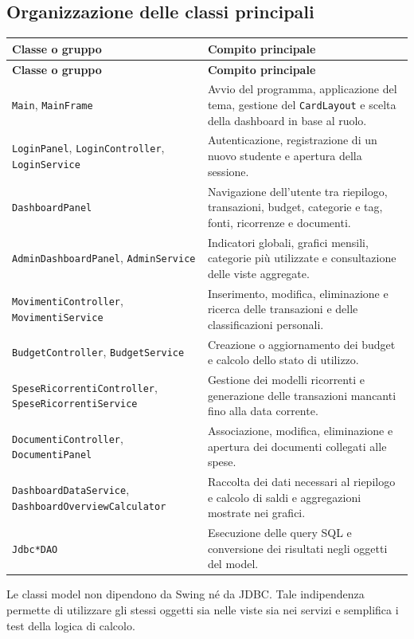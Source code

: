 \documentclass[11pt,a4paper]{article}
\begin{document}
\subsection{Organizzazione delle classi principali}
\begin{longtable}{p{5.1cm} p{9.5cm}}
\toprule
\textbf{Classe o gruppo} & \textbf{Compito principale} \\
\midrule
\endfirsthead
\toprule
\textbf{Classe o gruppo} & \textbf{Compito principale} \\
\midrule
\endhead
\texttt{Main}, \texttt{MainFrame} & Avvio del programma, applicazione del tema, gestione del \texttt{CardLayout} e scelta della dashboard in base al ruolo. \\
\texttt{LoginPanel}, \texttt{LoginController}, \texttt{LoginService} & Autenticazione, registrazione di un nuovo studente e apertura della sessione. \\
\texttt{DashboardPanel} & Navigazione dell'utente tra riepilogo, transazioni, budget, categorie e tag, fonti, ricorrenze e documenti. \\
\texttt{AdminDashboardPanel}, \texttt{AdminService} & Indicatori globali, grafici mensili, categorie più utilizzate e consultazione delle viste aggregate. \\
\texttt{MovimentiController}, \texttt{MovimentiService} & Inserimento, modifica, eliminazione e ricerca delle transazioni e delle classificazioni personali. \\
\texttt{BudgetController}, \texttt{BudgetService} & Creazione o aggiornamento dei budget e calcolo dello stato di utilizzo. \\
\texttt{SpeseRicorrentiController}, \texttt{SpeseRicorrentiService} & Gestione dei modelli ricorrenti e generazione delle transazioni mancanti fino alla data corrente. \\
\texttt{DocumentiController}, \texttt{DocumentiPanel} & Associazione, modifica, eliminazione e apertura dei documenti collegati alle spese. \\
\texttt{DashboardDataService}, \texttt{DashboardOverviewCalculator} & Raccolta dei dati necessari al riepilogo e calcolo di saldi e aggregazioni mostrate nei grafici. \\
\texttt{Jdbc*DAO} & Esecuzione delle query SQL e conversione dei risultati negli oggetti del model. \\
\bottomrule
\end{longtable}

Le classi model non dipendono da Swing né da JDBC. Tale indipendenza permette di utilizzare gli stessi oggetti sia nelle viste sia nei servizi e semplifica i test della logica di calcolo.
\end{document}
